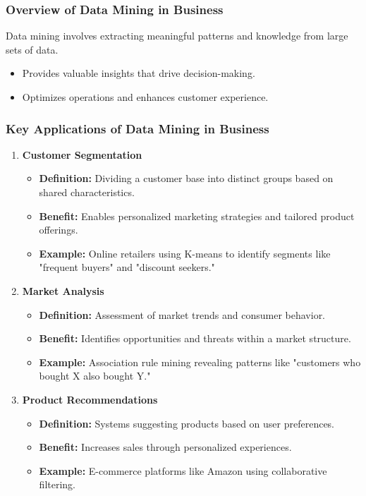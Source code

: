 \documentclass{beamer}
\begin{document}
\begin{frame}[fragile]
    \frametitle{Overview of Data Mining in Business}
    Data mining involves extracting meaningful patterns and knowledge from large sets of data. 
    \begin{itemize}
        \item Provides valuable insights that drive decision-making.
        \item Optimizes operations and enhances customer experience.
    \end{itemize}
\end{frame}

\begin{frame}[fragile]
    \frametitle{Key Applications of Data Mining in Business}
    \begin{enumerate}
        \item \textbf{Customer Segmentation}
        \begin{itemize}
            \item \textbf{Definition:} Dividing a customer base into distinct groups based on shared characteristics.
            \item \textbf{Benefit:} Enables personalized marketing strategies and tailored product offerings.
            \item \textbf{Example:} Online retailers using K-means to identify segments like "frequent buyers" and "discount seekers."
        \end{itemize}

        \item \textbf{Market Analysis}
        \begin{itemize}
            \item \textbf{Definition:} Assessment of market trends and consumer behavior.
            \item \textbf{Benefit:} Identifies opportunities and threats within a market structure.
            \item \textbf{Example:} Association rule mining revealing patterns like "customers who bought X also bought Y."
        \end{itemize}

        \item \textbf{Product Recommendations}
        \begin{itemize}
            \item \textbf{Definition:} Systems suggesting products based on user preferences.
            \item \textbf{Benefit:} Increases sales through personalized experiences.
            \item \textbf{Example:} E-commerce platforms like Amazon using collaborative filtering.
        \end{itemize}
    \end{enumerate}
\end{frame}
\end{document}
